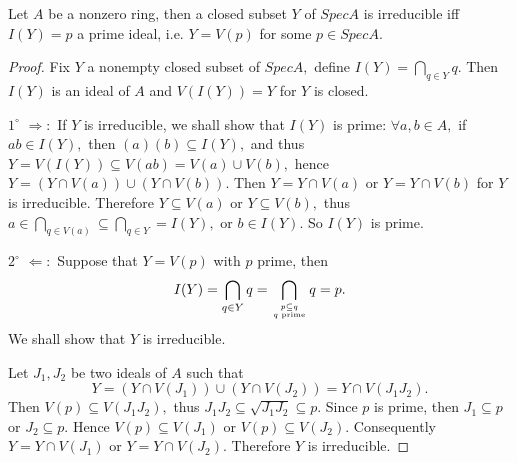 \begin{prop}
Let $A$ be a nonzero ring, then a closed subset $Y$ of $SpecA$ is
irreducible iff $I(Y)=p$ a prime ideal, i.e. $Y=V(p)$ for some $p\in
SpecA.$
\end{prop}
\begin{proof}
Fix $Y$ a nonempty closed subset of $SpecA,$ define
$I(Y)=\bigcap\limits_{q\in Y}q.$ Then $I(Y)$ is an ideal of $A$ and
$V(I(Y))=Y$ for $Y$ is closed.

$\mathit{1^{\circ}}$ $\Longrightarrow:$ If $Y$ is irreducible, we
shall show that $I(Y)$ is prime: $\forall a,b\in A,$ if $ab\in
I(Y),$ then $(a)(b)\subseteq I(Y),$ and thus $Y=V(I(Y))\subseteq
V(ab)=V(a)\cup V(b),$ hence $Y=(Y\cap V(a))\cup(Y\cap V(b)).$ Then
$Y=Y\cap V(a)$ or $Y=Y\cap V(b)$ for $Y$ is irreducible. Therefore
$Y\subseteq V(a)$ or $Y\subseteq V(b),$ thus
$a\in\bigcap\limits_{q\in V(a)}\subseteq\bigcap\limits_{q\in
Y}=I(Y),$ or $b\in I(Y).$ So $I(Y)$ is prime.

$\mathit{2^{\circ}}$ $\Longleftarrow:$ Suppose that $Y=V(p)$ with
$p$ prime, then $$I(Y)=\bigcap\limits_{q\in
Y}q=\bigcap\limits_{p\subseteq q \atop q \text{ prime}}q=p.$$ We
shall show that $Y$ is irreducible.

Let $J_1,J_2$ be two ideals of $A$ such that
$$Y=(Y\cap V(J_1))\cup(Y\cap V(J_2))=Y\cap V(J_1J_2).$$ Then
$V(p)\subseteq V(J_1J_2),$ thus
$J_1J_2\subseteq\sqrt{J_1J_2}\subseteq p.$ Since $p$ is prime, then
$J_1\subseteq p$ or $J_2\subseteq p.$ Hence $V(p)\subseteq V(J_1)$
or $V(p)\subseteq V(J_2).$ Consequently $Y=Y\cap V(J_1)$ or $Y=Y\cap
V(J_2).$ Therefore $Y$ is irreducible.
\end{proof}
